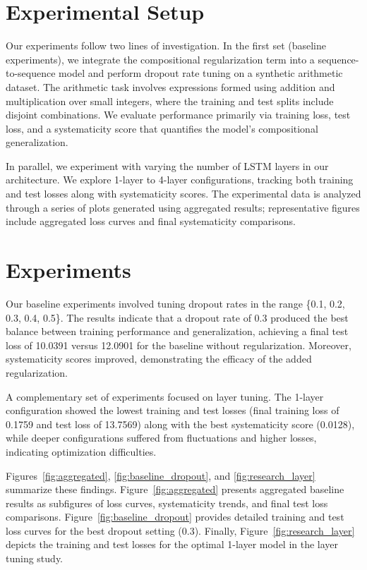 \documentclass{article} %
\theoremstyle{plain}
\theoremstyle{definition}
\theoremstyle{remark}
\begin{document}
\section{Experimental Setup}
Our experiments follow two lines of investigation. In the first set (baseline experiments), we integrate the compositional regularization term into a sequence-to-sequence model and perform dropout rate tuning on a synthetic arithmetic dataset. The arithmetic task involves expressions formed using addition and multiplication over small integers, where the training and test splits include disjoint combinations. We evaluate performance primarily via training loss, test loss, and a systematicity score that quantifies the model's compositional generalization.

In parallel, we experiment with varying the number of LSTM layers in our architecture. We explore 1-layer to 4-layer configurations, tracking both training and test losses along with systematicity scores. The experimental data is analyzed through a series of plots generated using aggregated results; representative figures include aggregated loss curves and final systematicity comparisons.

\section{Experiments}
Our baseline experiments involved tuning dropout rates in the range \{0.1, 0.2, 0.3, 0.4, 0.5\}. The results indicate that a dropout rate of 0.3 produced the best balance between training performance and generalization, achieving a final test loss of 10.0391 versus 12.0901 for the baseline without regularization. Moreover, systematicity scores improved, demonstrating the efficacy of the added regularization.

A complementary set of experiments focused on layer tuning. The 1-layer configuration showed the lowest training and test losses (final training loss of 0.1759 and test loss of 13.7569) along with the best systematicity score (0.0128), while deeper configurations suffered from fluctuations and higher losses, indicating optimization difficulties.

Figures~\ref{fig:aggregated}, \ref{fig:baseline_dropout}, and \ref{fig:research_layer} summarize these findings. Figure~\ref{fig:aggregated} presents aggregated baseline results as subfigures of loss curves, systematicity trends, and final test loss comparisons. Figure~\ref{fig:baseline_dropout} provides detailed training and test loss curves for the best dropout setting (0.3). Finally, Figure~\ref{fig:research_layer} depicts the training and test losses for the optimal 1-layer model in the layer tuning study.
\end{document}
